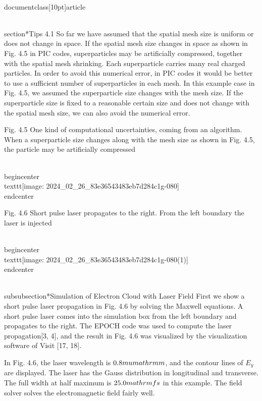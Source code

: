 \\documentclass[10pt]{article}
\begin{document}
\\section*{Tips 4.1}
So far we have assumed that the spatial mesh size is uniform or does not change in space. If the spatial mesh size changes in space as shown in Fig. 4.5 in PIC codes, superparticles may be artificially compressed, together with the spatial mesh shrinking. Each superparticle carries many real charged particles. In order to avoid this numerical error, in PIC codes it would be better to use a sufficient number of superparticles in each mesh. In this example case in Fig. 4.5, we assumed the superparticle size changes with the mesh size. If the superparticle size is fixed to a reasonable certain size and does not change with the spatial mesh size, we can also avoid the numerical error.

Fig. 4.5 One kind of computational uncertainties, coming from an algorithm. When a superparticle size changes along with the mesh size as shown in Fig. 4.5, the particle may be artificially compressed

\\begin{center}
\\texttt{[image: 2024\_02\_26\_83e36543483eb7d284c1g-080]}
\\end{center}

Fig. 4.6 Short pulse laser propagates to the right. From the left boundary the laser is injected

\\begin{center}
\\texttt{[image: 2024\_02\_26\_83e36543483eb7d284c1g-080(1)]}
\\end{center}

\\subsubsection*{Simulation of Electron Cloud with Laser Field}
First we show a short pulse laser propagation in Fig. 4.6 by solving the Maxwell equations. A short pulse laser comes into the simulation box from the left boundary and propagates to the right. The EPOCH code was used to compute the laser propagation[3, 4], and the result in Fig. 4.6 was visualized by the visualization software of Visit [17, 18].

In Fig. 4.6, the laser wavelength is $0.8 \\mu \\mathrm{m}$, and the contour lines of $E_{y}$ are displayed. The laser has the Gauss distribution in longitudinal and transverse. The full width at half maximum is $25.0 \\mathrm{fs}$ in this example. The field solver solves the electromagnetic field fairly well.
\end{document}
